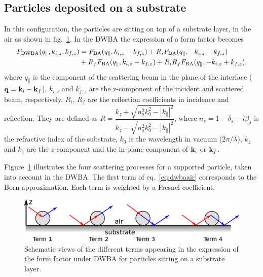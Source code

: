 \subsection{Particles deposited on a substrate}
In this configuration, the particles are sitting on top of a substrate layer, in the air as shown in fig.~\ref{fig:SchemDWBA}. In the DWBA the expression of a form factor becomes 
\begin{align}
F_{\rm{DWBA}}(q_{\parallel}, k_{i,z}, k_{f,z}) &= F_{\rm{BA}}(q_{\parallel}, k_{i,z}-k_{f,z})+ R_i F_{\rm{BA}}(q_{\parallel}, -k_{i,z}-k_{f,z}) \nonumber \\
&+ R_f F_{\rm{BA}}(q_{\parallel}, k_{i,z}+k_{f,z}) + R_i R_f F_{\rm{BA}}(q_{\parallel},-k_{i,z}+k_{f,z}), \label{eq:dwbaair}
\end{align}
where $q_{\parallel}$ is the component of the scattering beam in the plane of the interface ($\mathbf{q}=\mathbf{k}_i-\mathbf{k}_f$), $k_{i,z}$ and $k_{f,z}$ are the z-component of the incident and scattered beam, respectively. $R_i$, $R_f$ are the reflection coefficients in incidence and reflection. They are defined as $R=\dfrac{k_z+\sqrt{n_s^2k_0^2-|k_{\parallel}|^2}}{k_z-\sqrt{n_s^2 k_0^2-|k_{\parallel}|^2}}$, where $n_s=1-\delta_s -i \beta_s$ is the refractive index of the substrate, $k_0$ is the wavelength in vacuum ($2\pi /\lambda$), $k_z$ and $k_{\parallel}$ are the $z$-component and the in-plane component of $\mathbf{k}_i$ or $\mathbf{k}_f$. \\


\vspace{18pt}

Figure~\ref{fig:SchemDWBA} illustrates the four scattering processes for a supported particle, taken into account in the DWBA. The first term of eq.~\ref{eq:dwbaair}  corresponds to the Born approximation. Each term is weighted by a Fresnel coefficient. 

\begin{figure}[h]
\begin{center}
\includegraphics[width=\textwidth]{Figures/drawingDWBA}
\end{center}
\caption{Schematic views of the different terms appearing in the expression of the form factor under DWBA for particles sitting on a substrate layer.}
\label{fig:SchemDWBA}
\end{figure}


